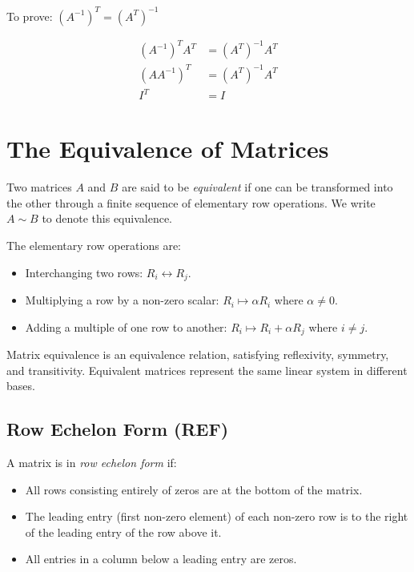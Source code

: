 To prove: \((A^{-1})^T = (A^T)^{-1}\)

\begin{align*} 
    (A^{-1})^T  A^T &= (A^T)^{-1} A^T \\
     (A A^{-1})^T   &= (A^T)^{-1} A^T \\  
     I^T &= I
\end{align*}

\QED

\section{The Equivalence of Matrices}

Two matrices \(A\) and \(B\) are said to be \emph{equivalent} if one can be transformed into the other through a finite sequence of elementary 
row operations. We write \(A \sim B\) to denote this equivalence.

The elementary row operations are:

\begin{itemize}

    \item Interchanging two rows: \(R_i \leftrightarrow R_j\).

    \item Multiplying a row by a non-zero scalar: \(R_i \mapsto \alpha R_i\) where \(\alpha \neq 0\).

    \item Adding a multiple of one row to another: \(R_i \mapsto R_i + \alpha R_j\) where \(i \neq j\).

\end{itemize}

Matrix equivalence is an equivalence relation, satisfying reflexivity, symmetry, and transitivity. Equivalent matrices represent the same linear 
system in different bases.

\subsection{Row Echelon Form (REF)}

A matrix is in \emph{row echelon form} if:

\begin{itemize}

    \item All rows consisting entirely of zeros are at the bottom of the matrix.

    \item The leading entry (first non-zero element) of each non-zero row is to the right of the leading entry of the row above it.

    \item All entries in a column below a leading entry are zeros.

\end{itemize}

